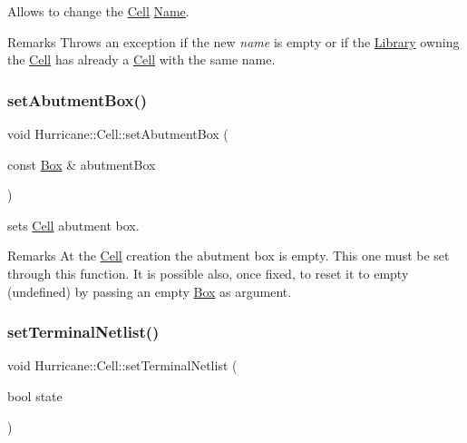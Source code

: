 Allows to change the \mbox{\hyperlink{classHurricane_1_1Cell}{Cell}} \mbox{\hyperlink{classHurricane_1_1Name}{Name}}.

\begin{DoxyRemark}{Remarks}
Throws an exception if the new {\itshape name} is empty or if the \mbox{\hyperlink{classHurricane_1_1Library}{Library}} owning the \mbox{\hyperlink{classHurricane_1_1Cell}{Cell}} has already a \mbox{\hyperlink{classHurricane_1_1Cell}{Cell}} with the same name. 
\end{DoxyRemark}
\mbox{\label{classHurricane_1_1Cell_ab1949e2b708f0bd2d215ab90cfe864e0}} 
\subsubsection{\texorpdfstring{set\+Abutment\+Box()}{setAbutmentBox()}}
{\footnotesize\ttfamily void Hurricane\+::\+Cell\+::set\+Abutment\+Box (\begin{DoxyParamCaption}\item[{const \mbox{\hyperlink{classHurricane_1_1Box}{Box}} \&}]{abutment\+Box }\end{DoxyParamCaption})}

sets \mbox{\hyperlink{classHurricane_1_1Cell}{Cell}} abutment box.

\begin{DoxyRemark}{Remarks}
At the \mbox{\hyperlink{classHurricane_1_1Cell}{Cell}} creation the abutment box is empty. This one must be set through this function. It is possible also, once fixed, to reset it to empty (undefined) by passing an empty \mbox{\hyperlink{classHurricane_1_1Box}{Box}} as argument. 
\end{DoxyRemark}
\mbox{\label{classHurricane_1_1Cell_a47ce34631bb9f6862caa13e5b25a4d8f}} 
\subsubsection{\texorpdfstring{set\+Terminal\+Netlist()}{setTerminalNetlist()}}
{\footnotesize\ttfamily void Hurricane\+::\+Cell\+::set\+Terminal\+Netlist (\begin{DoxyParamCaption}\item[{bool}]{state }\end{DoxyParamCaption})\hspace{0.3cm}{\ttfamily [inline]}}

